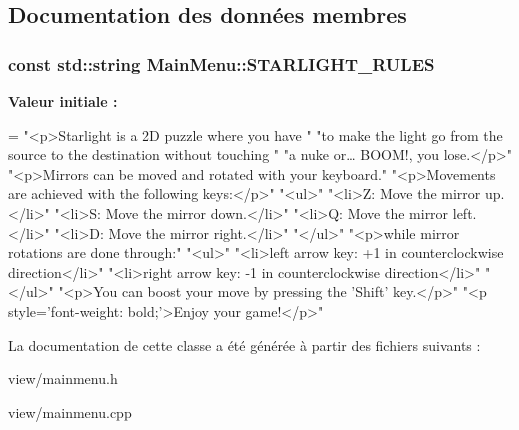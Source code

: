 \subsection{Documentation des données membres}
\hypertarget{classMainMenu_a48a2d4c53fc90f45d2cf63446d811b24}{
\subsubsection[{S\+T\+A\+R\+L\+I\+G\+H\+T\+\_\+\+R\+U\+L\+E\+S}]{\setlength{\rightskip}{0pt plus 5cm}const std\+::string Main\+Menu\+::\+S\+T\+A\+R\+L\+I\+G\+H\+T\+\_\+\+R\+U\+L\+E\+S\hspace{0.3cm}{\ttfamily [static]}}}\label{classMainMenu_a48a2d4c53fc90f45d2cf63446d811b24}
{\bfseries Valeur initiale \+:}
\begin{DoxyCode}
=
    \textcolor{stringliteral}{"<p>Starlight is a 2D puzzle where you have "}
    \textcolor{stringliteral}{"to make the light go from the source to the destination without touching "}
    \textcolor{stringliteral}{"a nuke or… BOOM!, you lose.</p>"}
    \textcolor{stringliteral}{"<p>Mirrors can be moved and rotated with your keyboard."}
    \textcolor{stringliteral}{"<p>Movements are achieved with the following keys:</p>"}
    \textcolor{stringliteral}{"<ul>"}
        \textcolor{stringliteral}{"<li>Z: Move the mirror up.</li>"}
        \textcolor{stringliteral}{"<li>S: Move the mirror down.</li>"}
        \textcolor{stringliteral}{"<li>Q: Move the mirror left.</li>"}
        \textcolor{stringliteral}{"<li>D: Move the mirror right.</li>"}
    \textcolor{stringliteral}{"</ul>"}
    \textcolor{stringliteral}{"<p>while mirror rotations are done through:"}
    \textcolor{stringliteral}{"<ul>"}
        \textcolor{stringliteral}{"<li>left arrow key: +1 in counterclockwise direction</li>"}
        \textcolor{stringliteral}{"<li>right arrow key: -1 in counterclockwise direction</li>"}
    \textcolor{stringliteral}{"</ul>"}
    \textcolor{stringliteral}{"<p>You can boost your move by pressing the 'Shift' key.</p>"}
    \textcolor{stringliteral}{"<p style='font-weight: bold;'>Enjoy your game!</p>"}
\end{DoxyCode}


La documentation de cette classe a été générée à partir des fichiers suivants \+:\begin{DoxyCompactItemize}
\item 
view/mainmenu.\+h\item 
view/mainmenu.\+cpp\end{DoxyCompactItemize}
